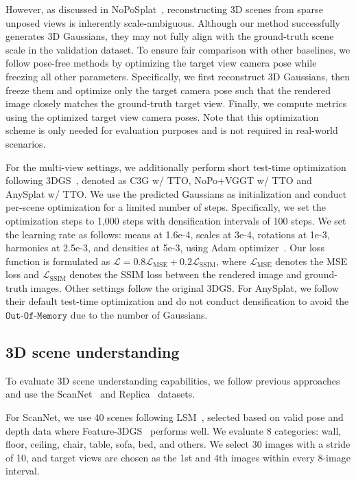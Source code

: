However, as discussed in NoPoSplat~\cite{ye2024no}, reconstructing 3D scenes from sparse unposed views is inherently scale-ambiguous. Although our method successfully generates 3D Gaussians, they may not fully align with the ground-truth scene scale in the validation dataset. To ensure fair comparison with other baselines, we follow pose-free methods by optimizing the target view camera pose while freezing all other parameters. Specifically, we first reconstruct 3D Gaussians, then freeze them and optimize only the target camera pose such that the rendered image closely matches the ground-truth target view. Finally, we compute metrics using the optimized target view camera poses. Note that this optimization scheme is only needed for evaluation purposes and is not required in real-world scenarios.

For the multi-view settings, we additionally perform short test-time optimization following 3DGS~\cite{kerbl20233d}, denoted as C3G w/ TTO, NoPo+VGGT w/ TTO and AnySplat w/ TTO. We use the predicted Gaussians as initialization and conduct per-scene optimization for a limited number of steps. Specifically, we set the optimization steps to 1,000 steps with densification intervals of 100 steps. We set the learning rate as follows: means at 1.6e-4, scales at 3e-4, rotations at 1e-3, harmonics at 2.5e-3, and densities at 5e-3, using Adam optimizer~\cite{kingma2014adam}.
Our loss function is formulated as $\mathcal{L} = 0.8\mathcal{L}_\text{MSE} + 0.2\mathcal{L}_\text{SSIM}$, where $\mathcal{L}_\text{MSE}$ denotes the MSE loss and $\mathcal{L}_\text{SSIM}$ denotes the SSIM loss between the rendered image and ground-truth images. Other settings follow the original 3DGS. For AnySplat, we follow their default test-time optimization and do not conduct densification to avoid the $\texttt{Out-Of-Memory}$ due to the number of Gaussians.

\subsection{3D scene understanding}

To evaluate 3D scene understanding capabilities, we follow previous approaches~\cite{fan2024large, burgess2006spatial} and use the ScanNet~\cite{dai2017scannet} and Replica~\cite{straub2019replica} datasets.

For ScanNet, we use 40 scenes following LSM~\cite{fan2024large}, selected based on valid pose and depth data where Feature-3DGS~\cite{zhou2024feature} performs well. We evaluate 8 categories: wall, floor, ceiling, chair, table, sofa, bed, and others. We select 30 images with a stride of 10, and target views are chosen as the 1st and 4th images within every 8-image interval.

